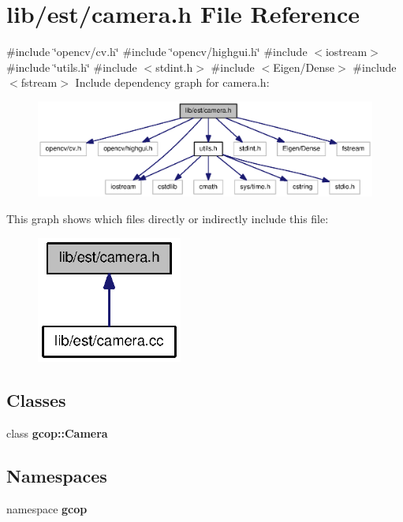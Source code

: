 \section{lib/est/camera.h \-File \-Reference}
\label{camera_8h}
{\ttfamily \#include \char`\"{}opencv/cv.\-h\char`\"{}}\*
{\ttfamily \#include \char`\"{}opencv/highgui.\-h\char`\"{}}\*
{\ttfamily \#include $<$iostream$>$}\*
{\ttfamily \#include \char`\"{}utils.\-h\char`\"{}}\*
{\ttfamily \#include $<$stdint.\-h$>$}\*
{\ttfamily \#include $<$\-Eigen/\-Dense$>$}\*
{\ttfamily \#include $<$fstream$>$}\*
\-Include dependency graph for camera.\-h\-:\nopagebreak
\begin{figure}[H]
\begin{center}
\leavevmode
\includegraphics[width=350pt]{camera_8h__incl}
\end{center}
\end{figure}
\-This graph shows which files directly or indirectly include this file\-:\nopagebreak
\begin{figure}[H]
\begin{center}
\leavevmode
\includegraphics[width=136pt]{camera_8h__dep__incl}
\end{center}
\end{figure}
\subsection*{\-Classes}
\begin{DoxyCompactItemize}
\item 
class {\bf gcop\-::\-Camera}
\end{DoxyCompactItemize}
\subsection*{\-Namespaces}
\begin{DoxyCompactItemize}
\item 
namespace {\bf gcop}
\end{DoxyCompactItemize}
